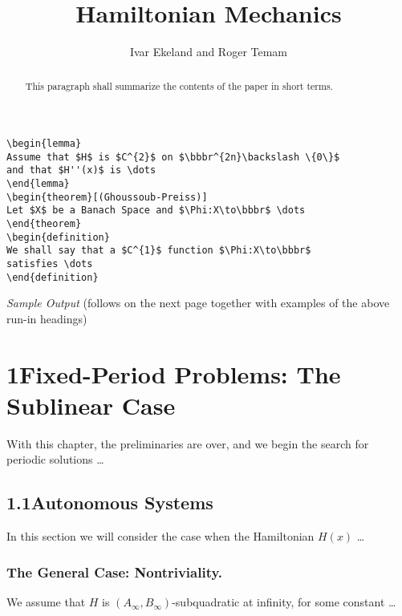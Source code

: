 \newpage
\begin{verbatim}
\begin{lemma}
Assume that $H$ is $C^{2}$ on $\bbbr^{2n}\backslash \{0\}$
and that $H''(x)$ is \dots
\end{lemma}
\begin{theorem}[(Ghoussoub-Preiss)]
Let $X$ be a Banach Space and $\Phi:X\to\bbbr$ \dots
\end{theorem}
\begin{definition}
We shall say that a $C^{1}$ function $\Phi:X\to\bbbr$
satisfies \dots
\end{definition}
\end{verbatim}
{\it Sample Output\/} (follows on the next page together with
examples of the above run-in headings)
%
\title{Hamiltonian Mechanics}

\author{Ivar Ekeland and Roger Temam}


\maketitle
%
\begin{abstract}
This paragraph shall summarize the contents of the paper
in short terms.
\end{abstract}
%
\section*{1\quad Fixed-Period Problems: The Sublinear Case}
%
With this chapter, the preliminaries are over, and we begin the search
for periodic solutions \dots
%
\subsection*{1.1\quad Autonomous Systems}
%
In this section we will consider the case when the Hamiltonian
$H(x)$ \dots
%
\subsubsection*{The General Case: Nontriviality.}
%
We assume that $H$ is
$\left(A_{\infty}, B_{\infty}\right)$-subqua\-dra\-tic at
infinity, for some constant \dots
%
